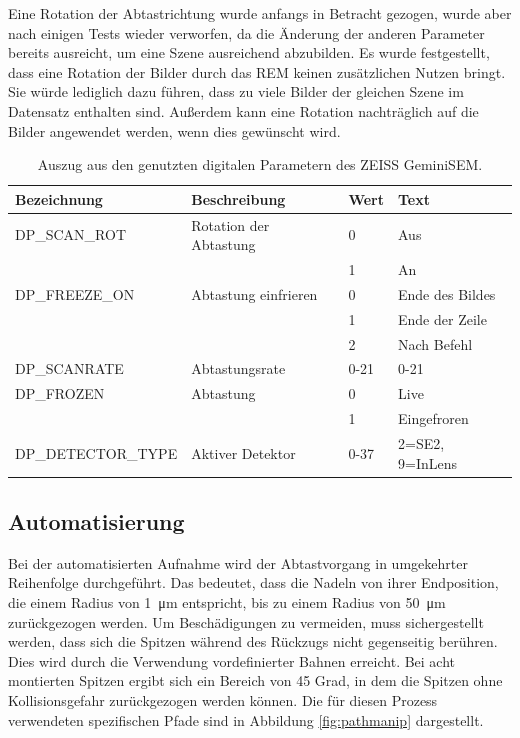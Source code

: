 Eine Rotation der Abtastrichtung wurde anfangs in Betracht gezogen, wurde aber nach einigen Tests wieder verworfen, da die Änderung der anderen Parameter bereits ausreicht, um eine Szene ausreichend abzubilden. Es wurde festgestellt, dass eine Rotation der Bilder durch das REM keinen zusätzlichen Nutzen bringt. Sie würde lediglich dazu führen, dass zu viele Bilder der gleichen Szene im Datensatz enthalten sind. Außerdem kann eine Rotation nachträglich auf die Bilder angewendet werden, wenn dies gewünscht wird. 
\begin{table}[h]
\begin{center}
\begin{tabular}{llll}
\toprule
Bezeichnung&Beschreibung&Wert&Text\\
\midrule
DP\_SCAN\_ROT&Rotation der Abtastung&0&Aus\\
&&1&An\\
DP\_FREEZE\_ON&Abtastung einfrieren&0&Ende des Bildes\\
&&1&Ende der Zeile\\
&&2&Nach Befehl\\
DP\_SCANRATE&Abtastungsrate&0-21&0-21\\
DP\_FROZEN&Abtastung&0&Live\\
&&1&Eingefroren\\
DP\_DETECTOR\_TYPE&Aktiver Detektor&0-37&2=SE2, 9=InLens\\
\bottomrule
\end{tabular}
\end{center}
\caption{Auszug aus den genutzten digitalen Parametern des ZEISS GeminiSEM.}
\label{tab:DP_Parameter}
\begin{small}
\end{small}
\end{table}
\newpage
\subsection{Automatisierung}
Bei der automatisierten Aufnahme wird der Abtastvorgang in umgekehrter Reihenfolge durchgeführt. Das bedeutet, dass die Nadeln von ihrer Endposition, die einem Radius von \SI{1}{\micro\metre} entspricht, bis zu einem Radius von \SI{50}{\micro\metre} zurückgezogen werden. Um Beschädigungen zu vermeiden, muss sichergestellt werden, dass sich die Spitzen während des Rückzugs nicht gegenseitig berühren. Dies wird durch die Verwendung vordefinierter Bahnen erreicht. Bei acht montierten Spitzen ergibt sich ein Bereich von 45 Grad, in dem die Spitzen ohne Kollisionsgefahr zurückgezogen werden können. Die für diesen Prozess verwendeten spezifischen Pfade sind in Abbildung \ref{fig:pathmanip} dargestellt.

